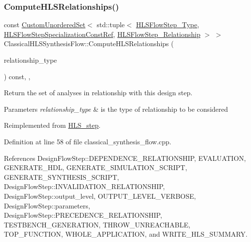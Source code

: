 \subsubsection{\texorpdfstring{Compute\+H\+L\+S\+Relationships()}{ComputeHLSRelationships()}}
{\footnotesize\ttfamily const \hyperlink{classCustomUnorderedSet}{Custom\+Unordered\+Set}$<$ std\+::tuple$<$ \hyperlink{hls__step_8hpp_ada16bc22905016180e26fc7e39537f8d}{H\+L\+S\+Flow\+Step\+\_\+\+Type}, \hyperlink{hls__step_8hpp_a5fdd2edf290c196531d21d68e13f0e74}{H\+L\+S\+Flow\+Step\+Specialization\+Const\+Ref}, \hyperlink{hls__step_8hpp_a3ad360b9b11e6bf0683d5562a0ceb169}{H\+L\+S\+Flow\+Step\+\_\+\+Relationship} $>$ $>$ Classical\+H\+L\+S\+Synthesis\+Flow\+::\+Compute\+H\+L\+S\+Relationships (\begin{DoxyParamCaption}\item[{const \hyperlink{classDesignFlowStep_a723a3baf19ff2ceb77bc13e099d0b1b7}{Design\+Flow\+Step\+::\+Relationship\+Type}}]{relationship\+\_\+type }\end{DoxyParamCaption}) const\hspace{0.3cm}{\ttfamily [override]}, {\ttfamily [protected]}, {\ttfamily [virtual]}}



Return the set of analyses in relationship with this design step. 


\begin{DoxyParams}{Parameters}
{\em relationship\+\_\+type} & is the type of relationship to be considered \\
\hline
\end{DoxyParams}


Reimplemented from \hyperlink{classHLS__step_aed0ce8cca9a1ef18e705fc1032ad4de5}{H\+L\+S\+\_\+step}.



Definition at line 58 of file classical\+\_\+synthesis\+\_\+flow.\+cpp.



References Design\+Flow\+Step\+::\+D\+E\+P\+E\+N\+D\+E\+N\+C\+E\+\_\+\+R\+E\+L\+A\+T\+I\+O\+N\+S\+H\+IP, E\+V\+A\+L\+U\+A\+T\+I\+ON, G\+E\+N\+E\+R\+A\+T\+E\+\_\+\+H\+DL, G\+E\+N\+E\+R\+A\+T\+E\+\_\+\+S\+I\+M\+U\+L\+A\+T\+I\+O\+N\+\_\+\+S\+C\+R\+I\+PT, G\+E\+N\+E\+R\+A\+T\+E\+\_\+\+S\+Y\+N\+T\+H\+E\+S\+I\+S\+\_\+\+S\+C\+R\+I\+PT, Design\+Flow\+Step\+::\+I\+N\+V\+A\+L\+I\+D\+A\+T\+I\+O\+N\+\_\+\+R\+E\+L\+A\+T\+I\+O\+N\+S\+H\+IP, Design\+Flow\+Step\+::output\+\_\+level, O\+U\+T\+P\+U\+T\+\_\+\+L\+E\+V\+E\+L\+\_\+\+V\+E\+R\+B\+O\+SE, Design\+Flow\+Step\+::parameters, Design\+Flow\+Step\+::\+P\+R\+E\+C\+E\+D\+E\+N\+C\+E\+\_\+\+R\+E\+L\+A\+T\+I\+O\+N\+S\+H\+IP, T\+E\+S\+T\+B\+E\+N\+C\+H\+\_\+\+G\+E\+N\+E\+R\+A\+T\+I\+ON, T\+H\+R\+O\+W\+\_\+\+U\+N\+R\+E\+A\+C\+H\+A\+B\+LE, T\+O\+P\+\_\+\+F\+U\+N\+C\+T\+I\+ON, W\+H\+O\+L\+E\+\_\+\+A\+P\+P\+L\+I\+C\+A\+T\+I\+ON, and W\+R\+I\+T\+E\+\_\+\+H\+L\+S\+\_\+\+S\+U\+M\+M\+A\+RY.

